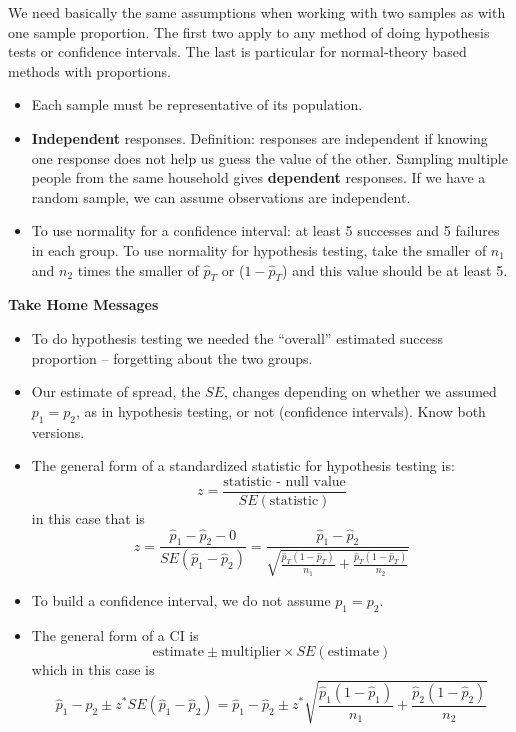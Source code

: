   We need basically the same assumptions when working with two samples
  as with one sample proportion.  The first two apply to any method
  of doing hypothesis tests or confidence intervals.  The last is
  particular for normal-theory based methods with proportions. 
  \begin{itemize}
     \item Each sample must be representative of its population. 
     \item {\bf Independent} responses.  Definition: responses are
       independent if knowing one response does not help us guess the
       value of the other.  Sampling multiple people from the same
       household gives {\bf dependent} responses.  If we have a random
       sample, we can assume observations are independent.
     \item To use normality for a confidence interval: at least 5
       successes and 5 failures in each group.  To use normality for
       hypothesis testing, take the smaller of $n_1$ and $n_2$ times
       the smaller of $\widehat{p}_T$ or ($1-\widehat{p}_T$) and this
       value should be at least 5.\vspace{1in}
  \end{itemize}



\begin{center}
  {\large\bf Take Home Messages}
\end{center}

\begin{itemize}
 \item  To do hypothesis testing we needed the ``overall'' estimated
   success proportion -- forgetting about the two groups. 
 \item Our estimate of spread, the $SE$, changes depending on whether
   we assumed $p_1=p_2$, as in hypothesis testing, or not (confidence
   intervals). Know both versions.
 \item  The general form of a standardized statistic for hypothesis
   testing is:
     $$z = \frac{\mbox{statistic - null value}}{SE(\mbox{statistic})}$$
in this case that is
$$ z = \frac{\widehat{p}_1 - \widehat{p}_2 -0}{ SE(\widehat{p}_1 -
  \widehat{p}_2)} = \frac{\widehat{p}_1 - \widehat{p}_2} 
   {\sqrt{\frac{\widehat{p}_T(1-\widehat{p}_T)}{n_1} +
    \frac{\widehat{p}_T(1-\widehat{p}_T)}{n_2}}}$$
\item To build a confidence interval, we do not assume ${p}_1 ={p}_2$.
\item The general form of a CI is
$$ \mbox{estimate} \pm \mbox{multiplier} \times SE(\mbox{estimate})$$
    which in this case is
  $$ \widehat{p}_1 - \widehat{p}_2 \pm z^* SE(\widehat{p}_1 -
  \widehat{p}_2) = \widehat{p}_1 - \widehat{p}_2 \pm z^* 
\sqrt{\frac{\widehat{p}_1(1 - \widehat{p}_1)}{n_1} + 
      \frac{\widehat{p}_2(1 - \widehat{p}_2)}{n_2}}$$
\end{itemize}\vfill




